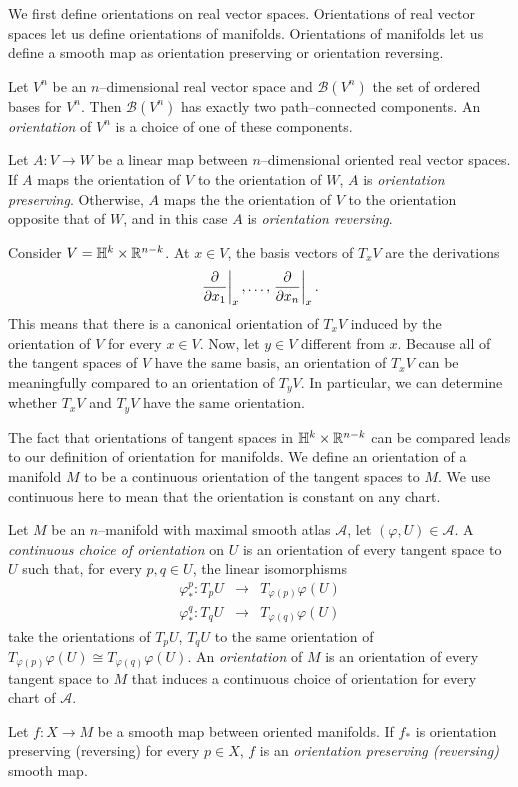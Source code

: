We first define orientations on real vector spaces.
Orientations of real vector spaces let us define orientations of manifolds.
Orientations of manifolds let us define a smooth map as orientation preserving or orientation reversing.

\begin{defn}
	\label{def:orientation}
	Let $V^n$ be an $n$--dimensional real vector space and $\mathcal{B}(V^n)$ the set of ordered bases for $V^n$.
	Then $\mathcal{B}(V^n)$ has exactly two path--connected components.
	An \emph{orientation} of $V^n$ is a choice of one of these components.
	
	Let $A:V\to W$ be a linear map between $n$--dimensional oriented real vector spaces.
	If $A$ maps the orientation of $V$ to the orientation of $W$, $A$ is \emph{orientation preserving}.
	Otherwise, $A$ maps the the orientation of $V$ to the orientation opposite that of $W$, and in this case $A$ is \emph{orientation reversing}.	
\end{defn}

\begin{ex}
	Consider $V=\mathbb{H}^k\times\mathbb{R}^{n-k}$.
	At $x\in V$, the basis vectors of $T_x V$ are the derivations
	\[
		\left.\frac{\partial}{\partial x_1}\right|_{x}, \dots, \left.\frac{\partial}{\partial x_n}\right|_{x}.
	\]
	This means that there is a canonical orientation of $T_x V$ induced by the orientation of $V$ for every $x\in V$.
	Now, let $y\in V$ different from $x$.
	Because all of the tangent spaces of $V$ have the same basis, an orientation of $T_x V$ can be meaningfully compared to an orientation of $T_y V$.
	In particular, we can determine whether $T_x V$ and $T_y V$ have the same orientation.
\end{ex}

The fact that orientations of tangent spaces in $\mathbb{H}^k\times\mathbb{R}^{n-k}$ can be compared leads to our definition of orientation for manifolds.
We define an orientation of a manifold $M$ to be a continuous orientation of the tangent spaces to $M$.
We use continuous here to mean that the orientation is constant on any chart.

\begin{defn}
	Let $M$ be an $n$--manifold with maximal smooth atlas $\mathcal{A}$, let $(\varphi, U)\in\mathcal{A}$.
	A \emph{continuous choice of orientation} on $U$ is an orientation of every tangent space to $U$ such that, for every $p,q\in U$, the linear isomorphisms
	\begin{eqnarray*}
		\varphi_*^p:T_p U&\to& T_{\varphi(p)}\varphi(U)\\
		\varphi_*^q:T_q U&\to& T_{\varphi(q)}\varphi(U)		
	\end{eqnarray*} take the orientations of $T_p U$, $T_q U$ to the same orientation of $T_{\varphi(p)}\varphi(U)\cong  T_{\varphi(q)}\varphi(U)$.
	An \emph{orientation} of $M$ is an orientation of every tangent space to $M$ that induces a continuous choice of orientation for every chart of $\mathcal{A}$. 
\end{defn}

\begin{defn}
	Let $f:X\to M$ be a smooth map between oriented manifolds.
	If $f_*$ is orientation preserving (reversing) for every $p\in X$, $f$ is an \emph{orientation preserving (reversing)} smooth map.	
\end{defn}
